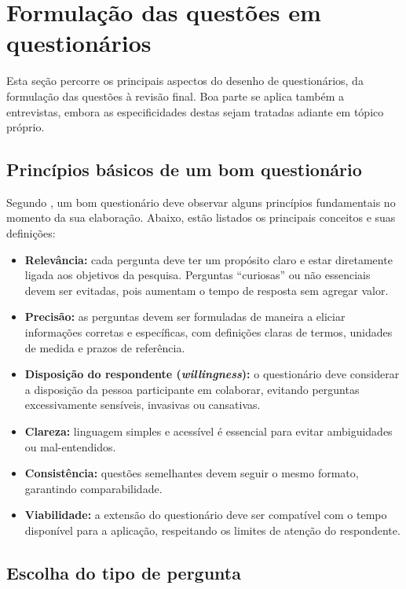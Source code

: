 \documentclass[12pt, a4paper, openany]{book}
\begin{document}
\section{Formula\c{c}\~ao das quest\~oes em question\'arios}

Esta se\c{c}\~ao percorre os principais aspectos do desenho de question\'arios, da formula\c{c}\~ao das quest\~oes \`a revis\~ao final. Boa parte se aplica tamb\'em a entrevistas, embora as especificidades destas sejam tratadas adiante em t\'opico pr\'oprio.

\subsection{Princ\'ipios b\'asicos de um bom question\'ario}

Segundo \citet{iarossi2006power}, um bom question\'ario deve observar alguns princ\'ipios fundamentais no momento da sua elabora\c{c}\~ao. Abaixo, est\~ao listados os principais conceitos e suas defini\c{c}\~oes:

\begin{itemize}
\item \textbf{Relev\^ancia:} cada pergunta deve ter um prop\'osito claro e estar diretamente ligada aos objetivos da pesquisa. Perguntas ``curiosas'' ou n\~ao essenciais devem ser evitadas, pois aumentam o tempo de resposta sem agregar valor.
\item \textbf{Precis\~ao:} as perguntas devem ser formuladas de maneira a eliciar informa\c{c}\~oes corretas e espec\'ificas, com defini\c{c}\~oes claras de termos, unidades de medida e prazos de refer\^encia.
\item \textbf{Disposi\c{c}\~ao do respondente (\textit{willingness}):} o question\'ario deve considerar a disposi\c{c}\~ao da pessoa participante em colaborar, evitando perguntas excessivamente sens\'iveis, invasivas ou cansativas.
\item \textbf{Clareza:} linguagem simples e acess\'ivel \'e essencial para evitar ambiguidades ou mal-entendidos.
\item \textbf{Consist\^encia:} quest\~oes semelhantes devem seguir o mesmo formato, garantindo comparabilidade.
\item \textbf{Viabilidade:} a extens\~ao do question\'ario deve ser compat\'ivel com o tempo dispon\'ivel para a aplica\c{c}\~ao, respeitando os limites de aten\c{c}\~ao do respondente.
\end{itemize}

\subsection{Escolha do tipo de pergunta}
\end{document}
